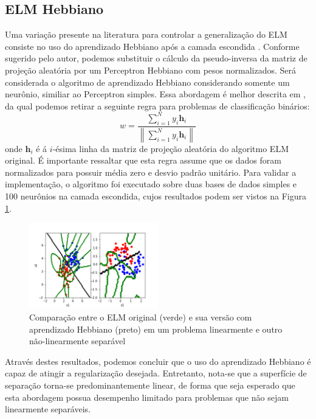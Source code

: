 \documentclass[conference]{IEEEtran}
\begin{document}
	\subsection{ELM Hebbiano}
	Uma variação presente na literatura para controlar a generalização do ELM consiste no uso do aprendizado Hebbiano após a camada escondida \cite{horta2015aplicaccao}. Conforme sugerido pelo autor, podemos substituir o cálculo da pseudo-inversa da matriz de projeção aleatória por um Perceptron Hebbiano com pesos normalizados. Será considerada o algoritmo de aprendizado Hebbiano considerando somente um neurônio, similiar ao Perceptron simples. Essa abordagem é melhor descrita em \cite{fernandez2011direct}, da qual podemos retirar a seguinte regra para problemas de classificação binários:
	\begin{equation}
		w = \frac{ \sum^{N}_{i=1} y_i\textbf{h}_i}{\left\|  \sum^{N}_{i=1} y_i\textbf{h}_i \right\| }
	\end{equation}
	onde $\textbf{h}_i$ é á $i$-ésima linha da matriz de projeção aleatória do algoritmo ELM original. É importante ressaltar que esta regra assume que os dados foram normalizados para possuir média zero e desvio padrão unitário. Para validar a implementação, o algoritmo foi executado sobre duas bases de dados simples e 100 neurônios na camada escondida, cujos resultados podem ser vistos na Figura \ref{fig:box-hebb-test}.
	
	\begin{figure}[thpbh]
		\centering
		\includegraphics[width=0.5\textwidth]{figures/hebb_test.png}
		\caption{Comparação entre o ELM original (verde) e sua versão com aprendizado Hebbiano (preto) em um problema linearmente e outro não-linearmente separável}
		\label{fig:box-hebb-test}
	\end{figure}
	
	Através destes resultados, podemos concluir que o uso do aprendizado Hebbiano é capaz de atingir a regularização desejada. Entretanto, nota-se que a superfície de separação torna-se predominantemente linear, de forma que seja esperado que esta abordagem possua desempenho limitado para problemas que não sejam linearmente separáveis.
	
\end{document}
